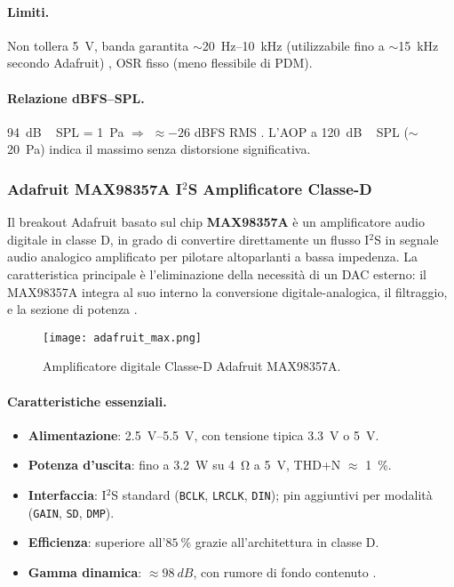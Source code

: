 \paragraph{Limiti.} Non tollera \SI{5}{V}, banda garantita $\sim$\SI{20}{Hz}--\SI{10}{kHz} (utilizzabile fino a $\sim$\SI{15}{kHz} secondo Adafruit) \citep{adafruit-product}, OSR fisso (meno flessibile di PDM).

\paragraph{Relazione dBFS--SPL.}
\SI{94}{dB\,SPL} = \SI{1}{Pa} $\Rightarrow$ $\approx -26$ dBFS RMS \citep{knowles-datasheet}. 
L’AOP a \SI{120}{dB\,SPL} ($\sim$\SI{20}{Pa}) indica il massimo senza distorsione significativa.


\subsubsection{Adafruit MAX98357A I$^2$S Amplificatore Classe-D}
\label{subsec:amplificatore}

Il breakout Adafruit basato sul chip \textbf{MAX98357A} è un amplificatore audio digitale in classe D, in grado di convertire direttamente un flusso
 I$^2$S in segnale audio analogico amplificato per pilotare altoparlanti a bassa impedenza. 
La caratteristica principale è l’eliminazione della necessità di un DAC esterno: il MAX98357A integra al suo interno la conversione digitale-analogica, 
il filtraggio, e la sezione di potenza \citep{maxim-datasheet,adafruit-guide-max98357}.
\begin{figure}[H]
  \centering
  \texttt{[image: adafruit\_max.png]}
  \caption{Amplificatore digitale Classe-D Adafruit MAX98357A.}
  \label{fig:adafruit_max}
  \end{figure}
\paragraph{Caratteristiche essenziali.}
\begin{itemize}
  \item \textbf{Alimentazione}: \SIrange{2.5}{5.5}{V}, con tensione tipica \SI{3.3}{V} o \SI{5}{V}. 
  \item \textbf{Potenza d’uscita}: fino a \SI{3.2}{W} su \SI{4}{\ohm} a \SI{5}{V}, THD+N $\approx$ \SI{1}{\%}.
  \item \textbf{Interfaccia}: I$^2$S standard (\texttt{BCLK}, \texttt{LRCLK}, \texttt{DIN}); pin aggiuntivi per modalità (\texttt{GAIN}, \texttt{SD}, \texttt{DMP}).
  \item \textbf{Efficienza}: superiore all’$\SI{85}{\%}$ grazie all’architettura in classe D.
  \item \textbf{Gamma dinamica}: $\approx \SI{98}{dB}$, con rumore di fondo contenuto \citep{maxim-datasheet}.
\end{itemize}

